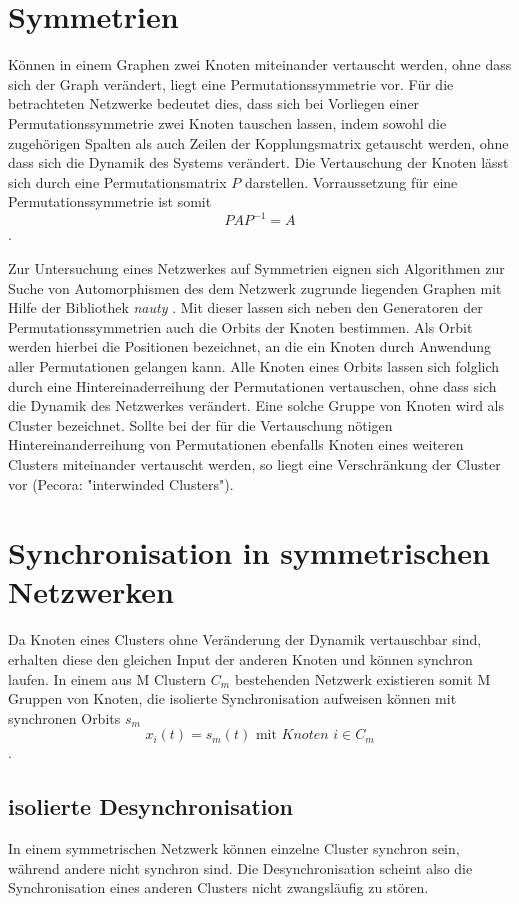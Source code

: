 \section{Symmetrien}
Können in einem Graphen zwei Knoten miteinander vertauscht werden, ohne dass sich der Graph verändert, liegt eine Permutationssymmetrie vor. Für die betrachteten Netzwerke bedeutet dies, dass sich bei Vorliegen einer Permutationssymmetrie zwei Knoten tauschen lassen, indem sowohl die zugehörigen Spalten als auch Zeilen der Kopplungsmatrix getauscht werden, ohne dass sich die Dynamik des Systems verändert. Die Vertauschung der Knoten lässt sich durch eine Permutationsmatrix $P$ darstellen. Vorraussetzung für eine Permutationssymmetrie ist somit
\begin{equation}
PAP^{-1}=A
\end{equation}.

Zur Untersuchung eines Netzwerkes auf Symmetrien eignen sich Algorithmen zur Suche von Automorphismen des dem Netzwerk zugrunde liegenden Graphen mit Hilfe der Bibliothek \textit{nauty} \cite{nauty}. Mit dieser lassen sich neben den Generatoren der Permutationssymmetrien auch die Orbits der Knoten bestimmen. Als Orbit werden hierbei die Positionen bezeichnet, an die ein Knoten durch Anwendung aller Permutationen gelangen kann. Alle Knoten eines Orbits lassen sich folglich durch eine Hintereinaderreihung der Permutationen vertauschen, ohne dass sich die Dynamik des Netzwerkes verändert. Eine solche Gruppe von Knoten wird als Cluster bezeichnet. Sollte bei der für die Vertauschung nötigen Hintereinanderreihung von Permutationen ebenfalls Knoten eines weiteren Clusters miteinander vertauscht werden, so liegt eine Verschränkung der Cluster vor (Pecora: "interwinded Clusters").

\section{Synchronisation in symmetrischen Netzwerken}
Da Knoten eines Clusters ohne Veränderung der Dynamik vertauschbar sind, erhalten diese den gleichen Input der anderen Knoten und können synchron laufen. In einem aus M Clustern $C_m$ bestehenden Netzwerk existieren somit M Gruppen von Knoten, die isolierte Synchronisation aufweisen können mit synchronen Orbits $s_m$
\begin{equation}
x_i(t)=s_m(t) \text{ mit } \textit{Knoten } i\in C_m
\end{equation}.

{\subsection*{isolierte Desynchronisation}}
In einem symmetrischen Netzwerk können einzelne Cluster synchron sein, während andere nicht synchron sind. Die Desynchronisation scheint also die Synchronisation eines anderen Clusters nicht zwangsläufig zu stören.

